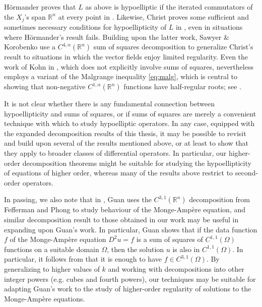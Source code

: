 \documentclass[oneside,hidelinks,indentfirst,10pt]{book}
\begin{document}
H\"ormander proves that \(L\) as above is hypoelliptic if the iterated commutators of the \(X_j\)'s span \(\mathbb{R}^n\) at every point in \cite{hormander}. Likewise, Christ proves some sufficient and sometimes necessary conditions for hypoellipticity of \(L\) in \cite{Christ_IDR}, even in situations where H\"ormander's result fails. Building upon the latter work, Sawyer \& Korobenko use a \(C^{4,\alpha}(\mathbb{R}^n)\) sum of squares decomposition to generalize Christ's result to situations in which the vector fields enjoy limited regularity. Even the work of Kohn in \cite{Kohn}, which does not explicitly involve sums of squares, nevertheless employs a variant of the Malgrange inequality \eqref{eq:malg}, which is central to showing that non-negative \(C^{1,\alpha}(\mathbb{R}^n)\) functions have half-regular roots; see \cite[Eq.(2.18)]{Kohn}.


It is not clear whether there is any fundamental connection between hypoellipticity and sums of squares, or if sums of squares are merely a convenient technique with which to study hypoelliptic operators. In any case, equipped with the expanded decomposition results of this thesis, it may be possible to revisit and build upon several of the results mentioned above, or at least to show that they apply to broader classes of differential operators. In particular, our higher-order decomposition theorems might be suitable for studying the hypoellipticity of equations of higher order, whereas many of the results above restrict to second-order operators.


In passing, we also note that in \cite{Guan}, Guan uses the \(C^{3,1}(\mathbb{R}^n)\) decomposition from Fefferman and Phong \cite{Fefferman-Phong} to study behaviour of the Monge-Amp\`ere equation, and similar decomposition result to those obtained in our work may be useful in expanding upon Guan's work. In particular, Guan shows that if the data function \(f\) of the Monge-Amp\`ere equation \(D^2u=f\) is a sum of squares of \(C^{1,1}(\Omega)\) functions on a suitable domain \(\Omega\), then the solution \(u\) is also in \(C^{1,1}(\Omega)\). In particular, it follows from \cite{Fefferman-Phong} that it is enough to have \(f\in C^{3,1}(\Omega)\). By generalizing to higher values of \(k\) and working with decompositions into other integer powers (e.g. cubes and fourth powers), our techniques may be suitable for adapting Guan's work to the study of higher-order regularity of solutions to the Monge-Amp\`ere equations.
\end{document}
